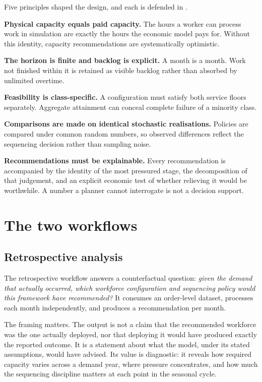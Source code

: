 Five principles shaped the design, and each is defended in .

\textbf{Physical capacity equals paid capacity.} The hours a worker can process work in
simulation are exactly the hours the economic model pays for. Without this identity, capacity
recommendations are systematically optimistic.

\textbf{The horizon is finite and backlog is explicit.} A month is a month. Work not finished
within it is retained as visible backlog rather than absorbed by unlimited overtime.

\textbf{Feasibility is class-specific.} A configuration must satisfy both service floors
separately. Aggregate attainment can conceal complete failure of a minority class.

\textbf{Comparisons are made on identical stochastic realisations.} Policies are compared under
common random numbers, so observed differences reflect the sequencing decision rather than
sampling noise.

\textbf{Recommendations must be explainable.} Every recommendation is accompanied by the
identity of the most pressured stage, the decomposition of that judgement, and an explicit
economic test of whether relieving it would be worthwhile. A number a planner cannot interrogate
is not a decision support.

\section{The two workflows}
\label{sec:workflows}

\subsection{Retrospective analysis}

The retrospective workflow answers a counterfactual question: \emph{given the demand that
actually occurred, which workforce configuration and sequencing policy would this framework
have recommended?} It consumes an order-level dataset, processes each month independently, and
produces a recommendation per month.

The framing matters. The output is not a claim that the recommended workforce was the one
actually deployed, nor that deploying it would have produced exactly the reported outcome. It
is a statement about what the model, under its stated assumptions, would have advised. Its
value is diagnostic: it reveals how required capacity varies across a demand year, where
pressure concentrates, and how much the sequencing discipline matters at each point in the
seasonal cycle.

